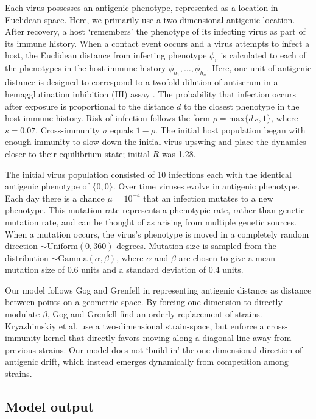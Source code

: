 \documentclass[11pt,oneside,letterpaper]{article}
\begin{document}
Each virus possesses an antigenic phenotype, represented as a location in Euclidean space.  Here, we primarily use a two-dimensional antigenic location.  After recovery, a host `remembers' the phenotype of its infecting virus as part of its immune history.  When a contact event occurs and a virus attempts to infect a host, the Euclidean distance from infecting phenotype $\phi_v$ is calculated to each of the phenotypes in the host immune history $\phi_{h_1}, \dots, \phi_{h_n}$.  Here, one unit of antigenic distance is designed to correspond to a twofold dilution of antiserum in a hemagglutination inhibition (HI) assay \cite{Smith04}. The probability that infection occurs after exposure is proportional to the distance $d$ to the closest phenotype in the host immune history.  Risk of infection follows the form $\rho = \textrm{max}\{d\,s,1\}$, where $s=0.07$.  Cross-immunity $\sigma$ equals $1-\rho$.  The initial host population began with enough immunity to slow down the initial virus upswing and place the dynamics closer to their equilibrium state; initial $R$ was 1.28.

The initial virus population consisted of 10 infections each with the identical antigenic phenotype of $\{0,0\}$.  Over time viruses evolve in antigenic phenotype.  Each day there is a chance $\mu = 10^{-4}$ that an infection mutates to a new phenotype.  This mutation rate represents a phenotypic rate, rather than genetic mutation rate, and can be thought of as arising from multiple genetic sources.  When a mutation occurs, the virus's phenotype is moved in a completely random direction $\sim \textrm{Uniform}(0,360)$ degrees. Mutation size is sampled from the distribution $\sim \textrm{Gamma}(\alpha,\beta)$, where $\alpha$ and $\beta$ are chosen to give a mean mutation size of 0.6 units and a standard deviation of 0.4 units.  

Our model follows Gog and Grenfell \cite{Gog02} in representing antigenic distance as distance between points on a geometric space.  By forcing one-dimension to directly modulate $\beta$, Gog and Grenfell find an orderly replacement of strains.  Kryazhimskiy et al. \cite{Kryazhimskiy07} use a two-dimensional strain-space, but enforce a cross-immunity kernel that directly favors moving along a diagonal line away from previous strains.  Our model does not `build in' the one-dimensional direction of antigenic drift, which instead emerges dynamically from competition among strains.

\subsection*{Model output}
\end{document}
